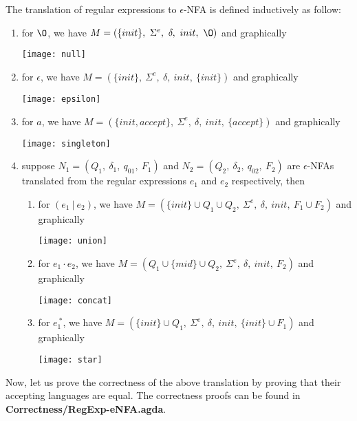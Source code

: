 \begin{defn}
\label{defn:thompson}
\noindent The translation of regular expressions
to \(\epsilon\)-NFA is defined inductively as follow:
\begin{enumerate}[nolistsep]
  \item for \(\O\), we have \(M = (\{init\},\ \Sigma^e,\ \delta,\
    init,\ \O)\) and graphically \begin{center}\texttt{[image: null]}\end{center}
  \item for \(\epsilon\), we have \(M = (\{init\},\ \Sigma^e,\
    \delta,\ init,\ \{init\})\) and graphically \begin{center}\texttt{[image: epsilon]}\end{center}
  \item for \(a\), we have \(M = (\{init, accept\},\ \Sigma^e,\
    \delta,\ init,\ \{accept\})\) and graphically \begin{center}\texttt{[image: singleton]}\end{center}
  \item suppose \(N_1 = (Q_1,\ \delta_1,\ q_{01},\ F_1)\) and \(N_2 =
    (Q_2,\ \delta_2,\ q_{02},\ F_2)\) are \(\epsilon\)-NFAs translated from the
    regular expressions \(e_1\) and \(e_2\) respectively, then
    \begin{enumerate}[nolistsep]
      \item for \((e_1\ |\ e_2)\), we have \(M = (\{init\} \cup Q_1
        \cup Q_2,\ \Sigma^e,\ \delta,\ init,\ F_1 \cup F_2)\) and
        graphically \begin{center}\texttt{[image: union]}\end{center}
      \item for \(e_1\cdot e_2\), we have \(M = (Q_1 \cup \{mid\}
        \cup Q_2,\ \Sigma^e,\ \delta,\ init,\ F_2)\) and graphically \begin{center}\texttt{[image: concat]}\end{center}
      \item for \(e_1^{\ *}\), we have \(M = (\{init\} \cup Q_1,\
        \Sigma^e,\ \delta,\ init,\ \{init\} \cup F_1)\) and
        graphically \begin{center}\texttt{[image: star]}\end{center}
     \end{enumerate}
\end{enumerate}
\end{defn}

\par Now, let us prove the correctness of the above translation by
proving that their accepting languages are equal. The correctness proofs
can be found in \textbf{Correctness/RegExp-eNFA.agda}. 

